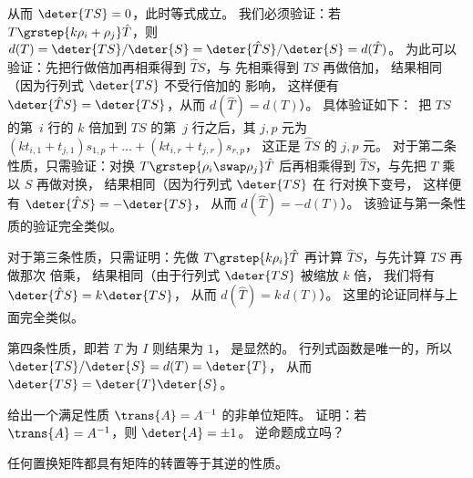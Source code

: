 \begin{exercises}
\begin{answer}
\begin{exparts}
          从而 $\deter{TS}=0$，此时等式成立。
        \partsitem 我们必须验证：若
          $T\smash[b]{\grstep{k\rho_i+\rho_j}}\hat{T}$，则
          $d(T)=\deter{TS}/\deter{S}=\deter{\hat{T}S}/\deter{S}=d(\hat{T})$。
          为此可以验证：先把行做倍加再相乘得到 \( \hat{T}S \)，与
          先相乘得到 \( TS \) 再做倍加，
          结果相同（因为行列式 \( \deter{TS} \) 不受行倍加的
          影响，
          这样便有 \( \deter{\hat{T}S}=\deter{TS} \)，从而
          \( d(\hat{T})=d(T) \)）。
          具体验证如下：~把 \( TS \) 的第~\( i \) 行的
          \( k \) 倍加到
          \( TS \) 的第~$j$ 行之后，其 \( j,p \) 元为
          \( (kt_{i,1}+t_{j,1})s_{1,p}+\dots+(kt_{i,r}+t_{j,r})s_{r,p} \)，
          这正是 \( \hat{T}S \) 的 \( j,p \) 元。
        \partsitem 对于第二条性质，只需验证：对换
          $T\smash[b]{\grstep{\rho_i\swap\rho_j}}\hat{T}$
          后再相乘得到 \( \hat{T}S \)，与先把 \( T \) 乘以 \( S \) 再做对换，
          结果相同（因为行列式 \( \deter{TS} \) 在
          行对换下变号，
          这样便有 \( \deter{\hat{T}S}=-\deter{TS} \)，
          从而 \( d(\hat{T})=-d(T) \)）。 
          该验证与第一条性质的验证完全类似。

          对于第三条性质，只需证明：先做
          $T\smash[b]{\grstep{k\rho_i}}\hat{T}$
          再计算 \( \hat{T}S \)，与先计算 \( TS \) 再做那次
          倍乘，
          结果相同（由于行列式 \( \deter{TS} \) 被缩放 \( k \) 倍，
          我们将有 \( \deter{\hat{T}S}=k\deter{TS} \)，
          从而 \( d(\hat{T})=k\,d(T) \)）。
          这里的论证同样与上面完全类似。

          第四条性质，即若 $T$ 为 $I$ 则结果为 $1$，
          是显然的。
        \partsitem 行列式函数是唯一的，所以
          \( \deter{TS}/\deter{S}=d(T)=\deter{T} \)，
          从而 $\deter{TS}=\deter{T}\deter{S}$。
      \end{exparts}
    \end{answer}
  \item 
    给出一个满足性质 \( \trans{A}=A^{-1} \) 的非单位矩阵。
    证明：若 \( \trans{A}=A^{-1} \)，则 \( \deter{A}=\pm 1 \)。
    逆命题成立吗？
    \begin{answer}
      任何置换矩阵都具有矩阵的转置等于其逆的性质。


\end{answer}
\end{exercises}
